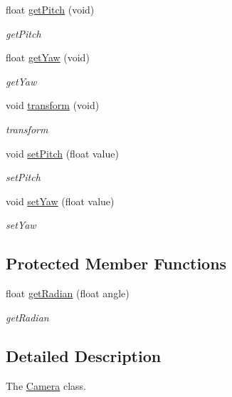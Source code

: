 \begin{DoxyCompactItemize}
\item 
float \hyperlink{classEngine_1_1Camera_ab71919b625658e16ea5664609d4fe30f}{get\+Pitch} (void)
\begin{DoxyCompactList}\small\item\em get\+Pitch \end{DoxyCompactList}\item 
float \hyperlink{classEngine_1_1Camera_a9c53dd61301fd51e532d5ba77c5e14dd}{get\+Yaw} (void)
\begin{DoxyCompactList}\small\item\em get\+Yaw \end{DoxyCompactList}\item 
void \hyperlink{classEngine_1_1Camera_ae37c21a512277b455ac79f57cc573be4}{transform} (void)
\begin{DoxyCompactList}\small\item\em transform \end{DoxyCompactList}\item 
void \hyperlink{classEngine_1_1Camera_a6d2bbb5124335a8cb3e7e871b4f5216b}{set\+Pitch} (float value)
\begin{DoxyCompactList}\small\item\em set\+Pitch \end{DoxyCompactList}\item 
void \hyperlink{classEngine_1_1Camera_aecaf00e8167268dec5f1745d3db06fd0}{set\+Yaw} (float value)
\begin{DoxyCompactList}\small\item\em set\+Yaw \end{DoxyCompactList}\end{DoxyCompactItemize}
\subsection*{Protected Member Functions}
\begin{DoxyCompactItemize}
\item 
float \hyperlink{classEngine_1_1Camera_a2d6b55fc92f272ab3e53833e8d069d7a}{get\+Radian} (float angle)
\begin{DoxyCompactList}\small\item\em get\+Radian \end{DoxyCompactList}\end{DoxyCompactItemize}


\subsection{Detailed Description}
The \hyperlink{classEngine_1_1Camera}{Camera} class. 

